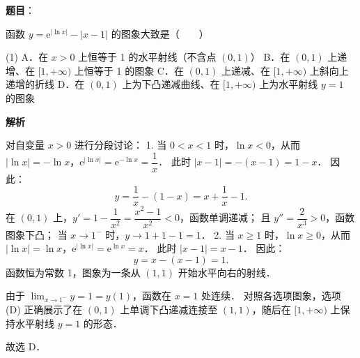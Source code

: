 \begin{answer}

\textbf{题目}：

函数 $y = \mathrm{e}^{|\ln x|} - |x - 1|$ 的图象大致是\mbox{（　　）}
\nopagebreak[4]
\begin{center}\end{center}
\nopagebreak[4]
\begin{gkopts}(1)
\task A．在 $x > 0$ 上恒等于 1 的水平射线（不含点 $(0, 1)$）
\task B．在 $(0, 1)$ 上递增、在 $[1, +\infty)$ 上恒等于 1 的图象
\task C．在 $(0, 1)$ 上递减、在 $[1, +\infty)$ 上斜向上递增的折线
\task D．在 $(0, 1)$ 上为下凸递减曲线、在 $[1, +\infty)$ 上为水平射线 $y = 1$ 的图象
\end{gkopts}

\textbf{解析}

对自变量 $x > 0$ 进行分段讨论：
1. 当 $0 < x < 1$ 时，$\ln x < 0$，从而 $|\ln x| = -\ln x$，$\mathrm{e}^{|\ln x|} = \mathrm{e}^{-\ln x} = \dfrac{1}{x}$．
   此时 $|x - 1| = -(x - 1) = 1 - x$．
   因此：
\nopagebreak[4]
\[
y = \frac{1}{x} - (1 - x) = x + \frac{1}{x} - 1.
\]
   在 $(0, 1)$ 上，$y' = 1 - \dfrac{1}{x^2} = \dfrac{x^2 - 1}{x^2} < 0$，函数单调递减；
   且 $y'' = \dfrac{2}{x^3} > 0$，函数图象下凸；
   当 $x \to 1^-$ 时，$y \to 1 + 1 - 1 = 1$．
2. 当 $x \geqslant 1$ 时，$\ln x \geqslant 0$，从而 $|\ln x| = \ln x$，$\mathrm{e}^{|\ln x|} = \mathrm{e}^{\ln x} = x$．
   此时 $|x - 1| = x - 1$．
   因此：
\nopagebreak[4]
\[
y = x - (x - 1) = 1.
\]
   函数恒为常数 1，图象为一条从 $(1, 1)$ 开始水平向右的射线．

由于 $\lim_{x \to 1^-} y = 1 = y(1)$，函数在 $x = 1$ 处连续．
对照各选项图象，选项 (D) 正确展示了在 $(0, 1)$ 上单调下凸递减连接至 $(1, 1)$，随后在 $[1, +\infty)$ 上保持水平射线 $y = 1$ 的形态．

故选 D．


\end{answer}
